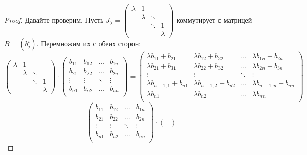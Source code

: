\begin{proof}
    Давайте проверим. Пусть
    $
    J_\lambda =
    \begin{pmatrix}
        \lambda & 1 & & \\
         & \lambda & \ddots & \\
         & & \ddots & 1 \\
         & & & \lambda
    \end{pmatrix}
    $ коммутирует с матрицей $B = (b^i_j)$. Перемножим их с обеих сторон:
    \[
    \begin{pmatrix}
        \lambda & 1 & & \\
         & \lambda & \ddots & \\
         & & \ddots & 1 \\
         & & & \lambda
    \end{pmatrix} \cdot
    \begin{pmatrix}
        b_{11} & b_{12} & \ldots & b_{1n}\\
        b_{21} & b_{22} & \ldots & b_{2n}\\
        \vdots & \vdots & \ddots & \vdots\\
        b_{n1} & b_{n2} & \ldots & b_{nn}\\
    \end{pmatrix} =
    \begin{pmatrix}
        \lambda b_{11} + b_{21} & \lambda b_{12} + b_{22} & \ldots & \lambda b_{1n} + b_{2n}\\
        \lambda b_{21} + b_{31} & \lambda b_{22} + b_{32} & \ldots & \lambda b_{2n} + b_{3n}\\
        \vdots & \vdots & \ddots & \vdots\\
        \lambda b_{n - 1, 1} + b_{n1} & \lambda b_{n - 1, 2} + b_{n2} & \ldots & \lambda b_{n - 1, n} + b_{nn}\\
        \lambda b_{n1} & \lambda b_{n2} & \ldots & \lambda b_{nn}\\
    \end{pmatrix}
    \]
    \[
    \begin{pmatrix}
        b_{11} & b_{12} & \ldots & b_{1n}\\
        b_{21} & b_{22} & \ldots & b_{2n}\\
        \vdots & \vdots & \ddots & \vdots\\
        b_{n1} & b_{n2} & \ldots & b_{nn}\\
    \end{pmatrix} \cdot
    \begin{pmatrix}

\end{pmatrix}\]
\end{proof}
